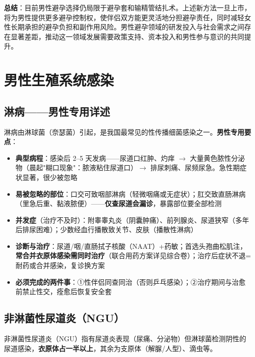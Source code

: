 \noindent\textbf{总结}：目前男性避孕选择仍局限于避孕套和输精管结扎术。上述新方法一旦上市，将为男性提供更多避孕控制权，使伴侣双方能更灵活地分担避孕责任，同时减轻女性长期承担的避孕负担和副作用风险。男性避孕领域的研发投入与社会需求之间存在显著差距，推动这一领域发展需要政策支持、资本投入和男性参与意识的共同提升。

\section{男性生殖系统感染}
\subsection{淋病——男性专用详述}


淋病由淋球菌（奈瑟菌）引起，是我国最常见的性传播细菌感染之一。\textbf{男性专用要点}：

\begin{itemize}
	\item \textbf{典型病程}：感染后 2--5 天发病——尿道口红肿、灼痒 $\rightarrow$ 大量黄色脓性分泌物（晨起"糊口现象"：脓液粘住尿道口）$\rightarrow$ 排尿刺痛、尿频尿急。急性期症状显著，很少被忽略
	\item \textbf{易被忽略的部位}：口交可致咽部淋病（轻微咽痛或无症状）；肛交致直肠淋病（里急后重、黏液脓便）——\textbf{仅查尿道会漏诊}，暴露部位要全部检测
	\item \textbf{并发症}（治疗不及时）：附睾睾丸炎（阴囊肿痛）、前列腺炎、尿道狭窄（多年后排尿困难）；少数经血行播散致关节、皮肤（播散性淋病）
	\item \textbf{诊断与治疗}：尿道/咽/直肠拭子核酸（NAAT）+药敏；首选头孢曲松肌注，\textbf{常合并衣原体感染需同时治疗}（联合用药方案详见综合卷）；治疗后症状不退=耐药或合并感染，复诊换方案
	\item \textbf{必须完成的两件事}：①性伴侣同查同治（否则乒乓感染）；②治疗期间与治愈前禁止性交，痊愈后恢复安全套
\end{itemize}

\subsection{非淋菌性尿道炎（NGU）}


非淋菌性尿道炎（NGU）指有尿道炎表现（尿痛、分泌物）但淋球菌检测阴性的尿道感染，\textbf{衣原体占一半以上}，其余为支原体（解脲/人型）、滴虫等。

